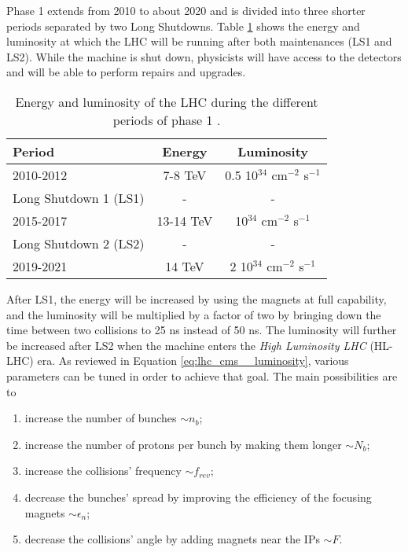            Phase 1 extends from 2010 to about 2020 and is divided into three shorter periods separated by two Long Shutdowns. Table \ref{tab:lhc_cms__lhc_performances} shows the energy and luminosity at which the LHC will be running after both maintenances (LS1 and LS2). While the machine is shut down, physicists will have access to the detectors and will be able to perform repairs and upgrades. \\

            \begin{table}[h!]
                \centering
                \begin{tabular}{l|c|c}
                    Period & Energy & Luminosity \\ \hline
                    2010-2012 & 7-8 TeV & 0.5 10$ ^{34} $ cm$ ^{-2} $ s$ ^{-1} $ \\
                    Long Shutdown 1 (LS1) & - & - \\
                    2015-2017 & 13-14 TeV & 10$ ^{34} $ cm$ ^{-2} $ s$ ^{-1} $ \\
                    Long Shutdown 2 (LS2) & - & - \\
                    2019-2021 & 14 TeV & 2 10$ ^{34} $ cm$ ^{-2} $ s$ ^{-1} $
                \end{tabular}
                \caption{Energy and luminosity of the LHC during the different periods of phase 1 \Cite{Evans:1129806}.}
                \label{tab:lhc_cms__lhc_performances}
            \end{table}

            After LS1, the energy will be increased by using the magnets at full capability, and the luminosity will be multiplied by a factor of two by bringing down the time between two collisions to 25 ns instead of 50 ns. The luminosity will further be increased after LS2 when the machine enters the \emph{High Luminosity LHC} (HL-LHC) era. As reviewed in Equation \ref{eq:lhc_cms__luminosity}, various parameters can be tuned in order to achieve that goal. The main possibilities are to \Cite{Koutchouk:1306815}
            \begin{enumerate}
                \item increase the number of bunches $ \sim n_b $;
                \item increase the number of protons per bunch by making them longer $ \sim N_b $;
                \item increase the collisions' frequency $ \sim f_{rev} $;
                \item decrease the bunches' spread by improving the efficiency of the focusing magnets $ \sim \epsilon_n $;
                \item decrease the collisions' angle by adding magnets near the IPs $ \sim F $. \\
            \end{enumerate}

